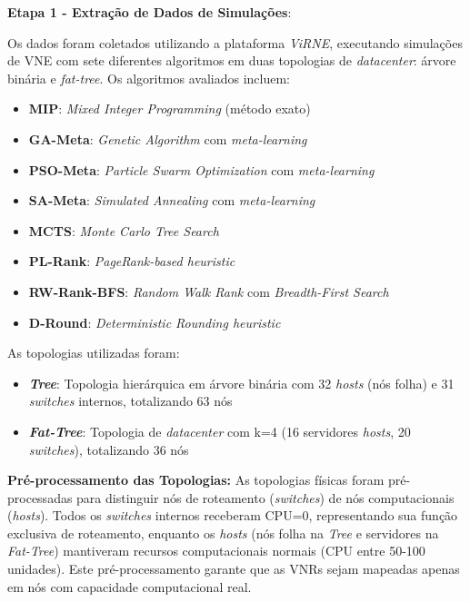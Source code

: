 \documentclass[conference]{IEEEtran}
\begin{document}
\textbf{Etapa 1 - Extração de Dados de Simulações}:

Os dados foram coletados utilizando a plataforma \textit{ViRNE}, executando simulações de VNE com sete diferentes algoritmos em duas topologias de \textit{datacenter}: árvore binária e \textit{fat-tree}. Os algoritmos avaliados incluem:

\begin{itemize}
    \item \textbf{MIP}: \textit{Mixed Integer Programming} (método exato)
    \item \textbf{GA-Meta}: \textit{Genetic Algorithm} com \textit{meta-learning}
    \item \textbf{PSO-Meta}: \textit{Particle Swarm Optimization} com \textit{meta-learning}
    \item \textbf{SA-Meta}: \textit{Simulated Annealing} com \textit{meta-learning}
    \item \textbf{MCTS}: \textit{Monte Carlo Tree Search}
    \item \textbf{PL-Rank}: \textit{PageRank-based heuristic}
    \item \textbf{RW-Rank-BFS}: \textit{Random Walk Rank} com \textit{Breadth-First Search}
    \item \textbf{D-Round}: \textit{Deterministic Rounding heuristic}
\end{itemize}

As topologias utilizadas foram:

\begin{itemize}
    \item \textbf{\textit{Tree}}: Topologia hierárquica em árvore binária com 32 \textit{hosts} (nós folha) e 31 \textit{switches} internos, totalizando 63 nós
    \item \textbf{\textit{Fat-Tree}}: Topologia de \textit{datacenter} com k=4 (16 servidores \textit{hosts}, 20 \textit{switches}), totalizando 36 nós
\end{itemize}

\textbf{Pré-processamento das Topologias:} As topologias físicas foram pré-processadas para distinguir nós de roteamento (\textit{switches}) de nós computacionais (\textit{hosts}). Todos os \textit{switches} internos receberam CPU=0, representando sua função exclusiva de roteamento, enquanto os \textit{hosts} (nós folha na \textit{Tree} e servidores na \textit{Fat-Tree}) mantiveram recursos computacionais normais (CPU entre 50-100 unidades). Este pré-processamento garante que as VNRs sejam mapeadas apenas em nós com capacidade computacional real.
\end{document}
